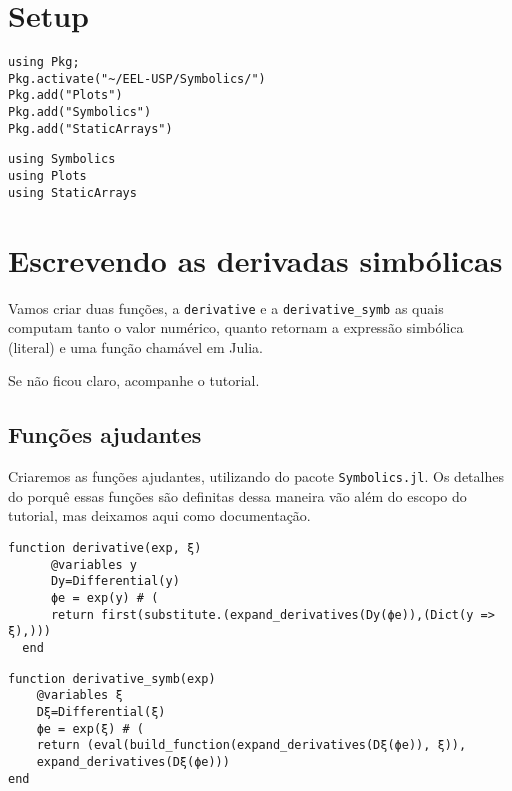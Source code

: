 \documentclass[12pt]{article}
\date{\today}
\title{}
\begin{document}
\tableofcontents

\section{Setup}
\label{sec:orgddbcd56}
\begin{verbatim}
using Pkg;
Pkg.activate("~/EEL-USP/Symbolics/")
Pkg.add("Plots")
Pkg.add("Symbolics")
Pkg.add("StaticArrays")
\end{verbatim}

\begin{verbatim}
using Symbolics
using Plots
using StaticArrays
\end{verbatim}

\section{Escrevendo as derivadas \textbf{simbólicas}}
\label{sec:org500faaf}
Vamos criar duas funções, a \texttt{derivative} e a \texttt{derivative\_symb} as quais computam tanto o valor numérico, quanto retornam a expressão simbólica (literal) e uma função chamável em Julia.

Se não ficou claro, acompanhe o tutorial. 

\clearpage
\subsection{Funções ajudantes}
\label{sec:orgbbb7933}
Criaremos as funções ajudantes, utilizando do pacote \texttt{Symbolics.jl}. Os detalhes do porquê essas funções são definitas dessa maneira vão além do escopo do tutorial, mas deixamos aqui como documentação.

\begin{verbatim}
function derivative(exp, ξ)
      @variables y
      Dy=Differential(y)
      ϕe = exp(y) # (
      return first(substitute.(expand_derivatives(Dy(ϕe)),(Dict(y => ξ),)))
  end
\end{verbatim}

\begin{verbatim}
function derivative_symb(exp)
    @variables ξ
    Dξ=Differential(ξ)
    ϕe = exp(ξ) # (
    return (eval(build_function(expand_derivatives(Dξ(ϕe)), ξ)),
    expand_derivatives(Dξ(ϕe)))
end
\end{verbatim}
\end{document}
